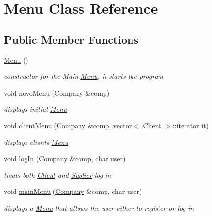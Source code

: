\hypertarget{class_menu}{}\section{Menu Class Reference}
\label{class_menu}
\subsection*{Public Member Functions}
\begin{DoxyCompactItemize}
\item 
\hypertarget{class_menu_ad466dd83355124a6ed958430450bfe94}{}\label{class_menu_ad466dd83355124a6ed958430450bfe94} 
\hyperlink{class_menu_ad466dd83355124a6ed958430450bfe94}{Menu} ()
\begin{DoxyCompactList}\small\item\em constructor for the Main \hyperlink{class_menu}{Menu}, it starts the program \end{DoxyCompactList}\item 
void \hyperlink{class_menu_adcf02507debb82d202a5849317fd475c}{novo\+Menu} (\hyperlink{class_company}{Company} \&comp)
\begin{DoxyCompactList}\small\item\em displays initial \hyperlink{class_menu}{Menu} \end{DoxyCompactList}\item 
void \hyperlink{class_menu_a84baff6bb52d20d742d5d750fad6750d}{client\+Menu} (\hyperlink{class_company}{Company} \&comp, vector$<$ \hyperlink{class_client}{Client} $>$\+::iterator it)
\begin{DoxyCompactList}\small\item\em displays clients \hyperlink{class_menu}{Menu} \end{DoxyCompactList}\item 
void \hyperlink{class_menu_a6226dbafc289ffa312b537d211462ba6}{log\+In} (\hyperlink{class_company}{Company} \&comp, char user)
\begin{DoxyCompactList}\small\item\em treats both \hyperlink{class_client}{Client} and \hyperlink{class_suplier}{Suplier} log in \end{DoxyCompactList}\item 
void \hyperlink{class_menu_ac04305abdf189f485546c323023fd8b6}{main\+Menu} (\hyperlink{class_company}{Company} \&comp, char user)
\begin{DoxyCompactList}\small\item\em displays a \hyperlink{class_menu}{Menu} that allows the user either to register or log in \end{DoxyCompactList}\item 

\end{DoxyCompactItemize}
